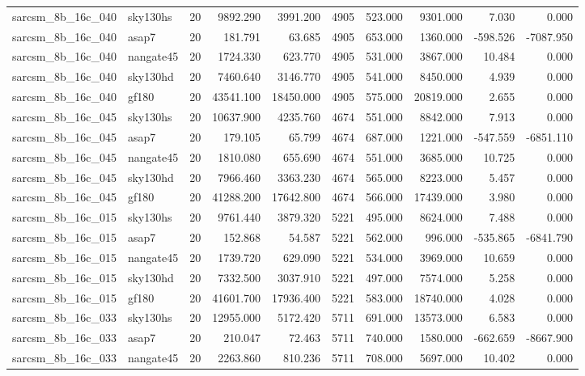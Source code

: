 \begin{tabular}{llrrrrrrrr}
sarcsm\_8b\_16c\_040 & sky130hs & 20 & 9892.290 & 3991.200 & 4905 & 523.000 & 9301.000 & 7.030 & 0.000 \\
sarcsm\_8b\_16c\_040 & asap7 & 20 & 181.791 & 63.685 & 4905 & 653.000 & 1360.000 & -598.526 & -7087.950 \\
sarcsm\_8b\_16c\_040 & nangate45 & 20 & 1724.330 & 623.770 & 4905 & 531.000 & 3867.000 & 10.484 & 0.000 \\
sarcsm\_8b\_16c\_040 & sky130hd & 20 & 7460.640 & 3146.770 & 4905 & 541.000 & 8450.000 & 4.939 & 0.000 \\
sarcsm\_8b\_16c\_040 & gf180 & 20 & 43541.100 & 18450.000 & 4905 & 575.000 & 20819.000 & 2.655 & 0.000 \\
sarcsm\_8b\_16c\_045 & sky130hs & 20 & 10637.900 & 4235.760 & 4674 & 551.000 & 8842.000 & 7.913 & 0.000 \\
sarcsm\_8b\_16c\_045 & asap7 & 20 & 179.105 & 65.799 & 4674 & 687.000 & 1221.000 & -547.559 & -6851.110 \\
sarcsm\_8b\_16c\_045 & nangate45 & 20 & 1810.080 & 655.690 & 4674 & 551.000 & 3685.000 & 10.725 & 0.000 \\
sarcsm\_8b\_16c\_045 & sky130hd & 20 & 7966.460 & 3363.230 & 4674 & 565.000 & 8223.000 & 5.457 & 0.000 \\
sarcsm\_8b\_16c\_045 & gf180 & 20 & 41288.200 & 17642.800 & 4674 & 566.000 & 17439.000 & 3.980 & 0.000 \\
sarcsm\_8b\_16c\_015 & sky130hs & 20 & 9761.440 & 3879.320 & 5221 & 495.000 & 8624.000 & 7.488 & 0.000 \\
sarcsm\_8b\_16c\_015 & asap7 & 20 & 152.868 & 54.587 & 5221 & 562.000 & 996.000 & -535.865 & -6841.790 \\
sarcsm\_8b\_16c\_015 & nangate45 & 20 & 1739.720 & 629.090 & 5221 & 534.000 & 3969.000 & 10.659 & 0.000 \\
sarcsm\_8b\_16c\_015 & sky130hd & 20 & 7332.500 & 3037.910 & 5221 & 497.000 & 7574.000 & 5.258 & 0.000 \\
sarcsm\_8b\_16c\_015 & gf180 & 20 & 41601.700 & 17936.400 & 5221 & 583.000 & 18740.000 & 4.028 & 0.000 \\
sarcsm\_8b\_16c\_033 & sky130hs & 20 & 12955.000 & 5172.420 & 5711 & 691.000 & 13573.000 & 6.583 & 0.000 \\
sarcsm\_8b\_16c\_033 & asap7 & 20 & 210.047 & 72.463 & 5711 & 740.000 & 1580.000 & -662.659 & -8667.900 \\
sarcsm\_8b\_16c\_033 & nangate45 & 20 & 2263.860 & 810.236 & 5711 & 708.000 & 5697.000 & 10.402 & 0.000 \\

\end{tabular}

